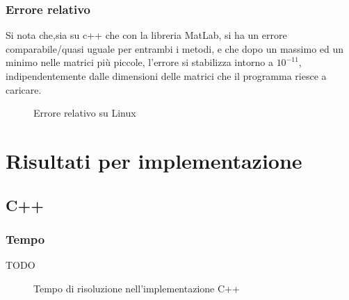 \documentclass[11pt,italian]{article}
\begin{document}
\subsubsection*{Errore relativo}
Si nota che,sia su c++ che con la libreria MatLab, si ha un errore comparabile/quasi uguale per entrambi i metodi, e che dopo un massimo ed un minimo nelle matrici più piccole, l'errore si stabilizza intorno a $10^{-11}$, indipendentemente dalle dimensioni delle matrici che il programma riesce a caricare.
\begin{figure}[H]
    \caption{Errore relativo su Linux}
    \label{fig:linux-error}
\end{figure}

\newpage
\section{Risultati per implementazione}
\label{section-results-os}

\subsection{C++}
\subsubsection*{Tempo}
TODO
\begin{figure}[H]
    \caption{Tempo di risoluzione nell'implementazione C++}
    \label{fig:cpp-time}
\end{figure}
\end{document}
